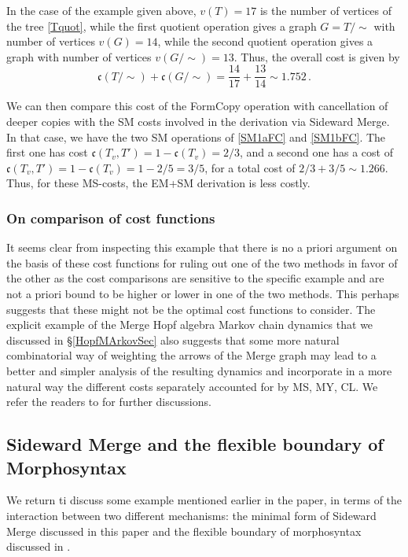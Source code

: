 \documentclass[12pt]{amsart}
\numberwithin{equation}{section}
\def\fc{{\mathfrak c}}
\begin{document}
 In the case of the example given above, $v(T)=17$ is the number of vertices of the tree \eqref{Tquot},
 while the first quotient operation gives a graph $G=T/\sim$ with number of vertices $v(G)=14$, while
 the second quotient operation gives a graph with number of vertices $v(G/\sim)=13$. Thus, the overall
 cost is given by 
 $$ \fc(T/\sim)+ \fc(G/\sim)=\frac{14}{17} + \frac{13}{14} \sim 1.752\, . $$
 
 We can then compare this cost of the FormCopy operation with 
cancellation of deeper copies with the SM costs involved
in the derivation via Sideward Merge. In that case, we have the two
SM operations of \eqref{SM1aFC} and \eqref{SM1bFC}. The first one has
cost $\fc(T_v,T')= 1-\fc(T_v)=2/3$, and a second one 
has a cost of $\fc(T_v,T')= 1-\fc(T_v)=1-2/5=3/5$, for a total cost of
 $2/3+3/5\sim 1.266$. Thus, for these MS-costs, the EM+SM derivation
 is less costly.
 
\subsubsection{On comparison of cost functions} 
It seems clear from inspecting this example that there is no a priori argument
on the basis of these cost functions for ruling out one of the two methods in
favor of the other as the cost comparisons are sensitive to the specific
example and are not a priori bound to be higher or lower in one of the
two methods. This perhaps suggests that these might not be the optimal
cost functions to consider. The explicit example of the Merge Hopf algebra
Markov chain dynamics that we discussed in \S \ref{HopfMArkovSec}
also suggests that some more natural combinatorial way of weighting the arrows of the
Merge graph may lead to a better and simpler analysis of the resulting
dynamics and incorporate in a more natural way the different costs
separately accounted for by MS, MY, CL. We refer the readers to \cite{MarSkig} for further discussions.
 
 
\subsection{Sideward Merge and the flexible boundary of Morphosyntax}\label{MSboundarySec}

We return ti discuss some example mentioned earlier in the
paper, in terms of the interaction between two different mechanisms:
the minimal form of Sideward Merge discussed in this paper and
the flexible boundary of morphosyntax discussed in \cite{SentMar}.
\end{document}
